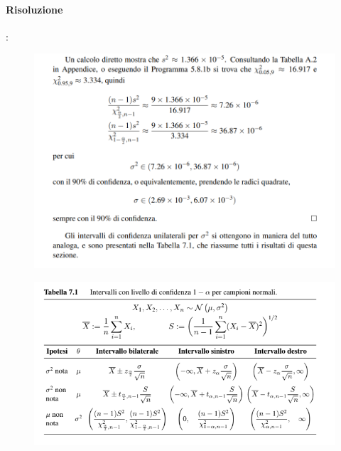 \documentclass[]{article}
\begin{document}
    \paragraph{Risoluzione}:
    \begin{figure}[H]
        \includegraphics[width=\textwidth]{images/boh_17.png}
    \end{figure}
    \begin{figure}[H]
        \includegraphics[width=\textwidth]{images/boh_2.png}
    \end{figure}
\end{document}
